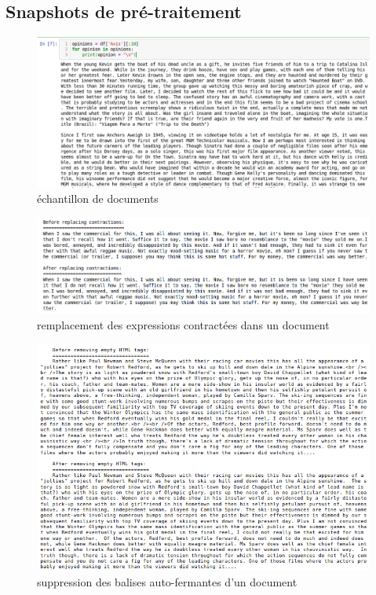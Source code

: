 \documentclass[12pt,a4paper]{report}
\theoremstyle{definition}
\begin{document}
\begin{appendices}
\chapter{Snapshots de pré-traitement}
\begin{figure}[!ht]
  \centering
  \includegraphics[scale=0.4]{images/snapshots/documents_sample.png}
  \caption{échantillon de documents}
  \label{fig:document_sample}
\end{figure}

\begin{figure}[!ht]
  \centering
  \includegraphics[scale=0.4]{images/snapshots/replace_contractions.png}
  \caption{remplacement des expressions contractées dans un document}
  \label{fig:replace_contractions}
\end{figure}

\begin{figure}[!ht]
  \centering
  \includegraphics[scale=0.6]{images/snapshots/remove_empty_html_tags.png}
  \caption{suppression des balises auto-fermantes d'un document}
  \label{fig:remove_empty_html_tags}
\end{figure}


\end{appendices}
\end{document}
